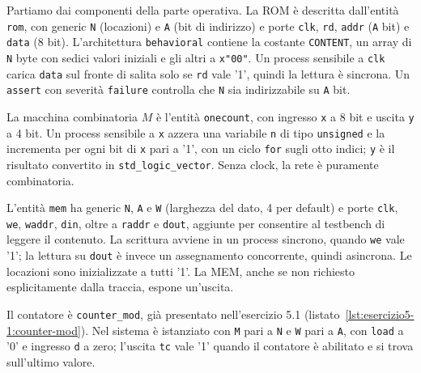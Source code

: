 \implementazione

Partiamo dai componenti della parte operativa. La ROM è descritta dall'entità \texttt{rom}, con generic \texttt{N} (locazioni) e \texttt{A} (bit di indirizzo) e porte \texttt{clk}, \texttt{rd}, \texttt{addr} (\texttt{A} bit) e \texttt{data} (8 bit). L'architettura \texttt{behavioral} contiene la costante \texttt{CONTENT}, un array di \texttt{N} byte con sedici valori iniziali e gli altri a \texttt{x"00"}. Un process sensibile a \texttt{clk} carica \texttt{data} sul fronte di salita solo se \texttt{rd} vale '1', quindi la lettura è sincrona. Un \texttt{assert} con severità \texttt{failure} controlla che \texttt{N} sia indirizzabile su \texttt{A} bit. 


La macchina combinatoria $M$ è l'entità \texttt{onecount}, con ingresso \texttt{x} a 8 bit e uscita \texttt{y} a 4 bit. Un process sensibile a \texttt{x} azzera una variabile \texttt{n} di tipo \texttt{unsigned} e la incrementa per ogni bit di \texttt{x} pari a '1', con un ciclo \texttt{for} sugli otto indici; \texttt{y} è il risultato convertito in \texttt{std\_logic\_vector}. Senza clock, la rete è puramente combinatoria.


L'entità \texttt{mem} ha generic \texttt{N}, \texttt{A} e \texttt{W} (larghezza del dato, 4 per default) e porte \texttt{clk}, \texttt{we}, \texttt{waddr}, \texttt{din}, oltre a \texttt{raddr} e \texttt{dout}, aggiunte per consentire al testbench di leggere il contenuto. La scrittura avviene in un process sincrono, quando \texttt{we} vale '1'; la lettura su \texttt{dout} è invece un assegnamento concorrente, quindi asincrona. Le locazioni sono inizializzate a tutti '1'. La MEM, anche se non richiesto esplicitamente dalla traccia, espone un'uscita.


Il contatore è \texttt{counter\_mod}, già presentato nell'esercizio 5.1 (listato~\ref{lst:esercizio5-1:counter-mod}). Nel sistema è istanziato con \texttt{M} pari a \texttt{N} e \texttt{W} pari a \texttt{A}, con \texttt{load} a '0' e ingresso \texttt{d} a zero; l'uscita \texttt{tc} vale '1' quando il contatore è abilitato e si trova sull'ultimo valore.


